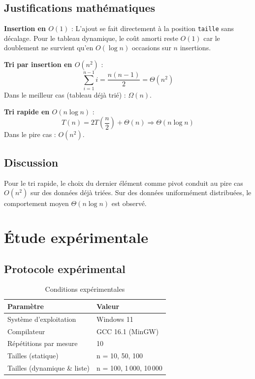 \documentclass[12pt, a4paper]{article}
\begin{document}
\subsection{Justifications mathématiques}

\textbf{Insertion en $O(1)$} : L'ajout se fait directement à la 
position \texttt{taille} sans décalage. Pour le tableau dynamique, 
le coût amorti reste $O(1)$ car le doublement ne survient qu'en 
$O(\log n)$ occasions sur $n$ insertions.

\textbf{Tri par insertion en $O(n^2)$} :
$$\sum_{i=1}^{n-1} i = \frac{n(n-1)}{2} = \Theta(n^2)$$
Dans le meilleur cas (tableau déjà trié) : $\Omega(n)$.

\textbf{Tri rapide en $O(n\log n)$} :
$$T(n) = 2T\left(\frac{n}{2}\right) + \Theta(n) \Rightarrow \Theta(n\log n)$$
Dans le pire cas : $O(n^2)$.

\subsection{Discussion}
Pour le tri rapide, le choix du dernier élément comme pivot 
conduit au pire cas $O(n^2)$ sur des données déjà triées. 
Sur des données uniformément distribuées, le comportement 
moyen $\Theta(n\log n)$ est observé.

\section{Étude expérimentale}

\subsection{Protocole expérimental}

\begin{table}[h]
\centering
{}
\begin{tabular}{l l}
\toprule
\textbf{Paramètre} & \textbf{Valeur} \\
\midrule
Système d'exploitation & Windows 11 \\
Compilateur & GCC 16.1 (MinGW) \\
Répétitions par mesure & 10 \\
Tailles (statique) & n = 10, 50, 100 \\
Tailles (dynamique \& liste) & n = 100, 1\,000, 10\,000 \\
\bottomrule
\end{tabular}
\caption{Conditions expérimentales}
\end{table}
\end{document}
